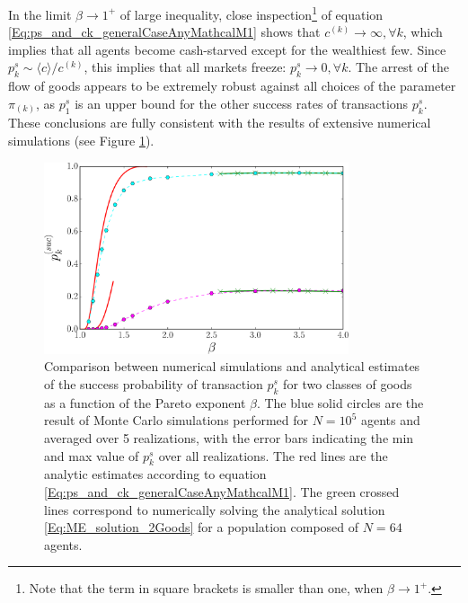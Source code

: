 In the limit  $\beta \to 1^+$ of large inequality, close inspection\footnote{Note that the term in square brackets is smaller than one, when $\beta \to 1^+$.} of equation  \eqref{Eq:ps_and_ck_generalCaseAnyMathcalM1} shows that $ c^{(k)}  \to \infty, \forall k$, 
which implies that all agents become cash-starved except for the wealthiest few. Since $p^s_{k}\sim \langle c \rangle /c^{(k)}$, this implies that all markets freeze: $p^s_{k}\to 0 , \forall k$.  The arrest of the flow of goods appears to be  extremely robust against all choices of the parameter $\pi_{(k)}$, as $p^s_{1}$ is an upper bound for the other success rates of transactions $p^s_{k}$. These conclusions are fully consistent with the results of extensive numerical simulations (see Figure \ref{Fig:summary_section_one_object}).

\begin{figure}
\includegraphics[width=0.8\textwidth]{figs_ineq/fig_K=2_e=1p2_ps_prediction_adjustedcapital.pdf}
\caption{Comparison between numerical simulations and analytical estimates of the success probability of transaction $p^s_k$ for two classes of goods as a function of the Pareto exponent $\beta$. The blue solid circles are the result  of Monte Carlo simulations performed for $N=10^5$ agents and averaged over 5 realizations, with the error bars indicating the min and max value of $p^s_k$ over all realizations. The red lines are the analytic estimates  according to equation \eqref{Eq:ps_and_ck_generalCaseAnyMathcalM1}. The green crossed lines correspond to numerically solving the analytical solution  \eqref{Eq:ME_solution_2Goods} for a population composed of $N=64$ agents.
}
\label{Fig:summary_section_one_object}
\end{figure}

